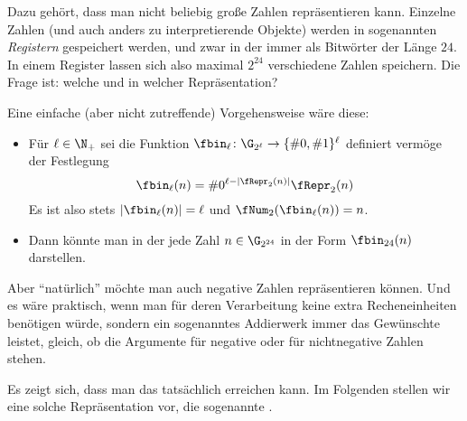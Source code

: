 Dazu gehört, dass man nicht beliebig große Zahlen repräsentieren kann.
%
Einzelne Zahlen (und auch anders zu interpretierende Objekte) werden
in sogenannten \emph{Registern} gespeichert werden, und zwar in der
\mima immer als Bitwörter der Länge $24$. 
%
In einem Register lassen sich also maximal $2^{24}$
verschiedene Zahlen speichern. 
%
Die Frage ist: welche und in welcher Repräsentation?

Eine einfache (aber nicht zutreffende) Vorgehensweise wäre diese: 
%
\begin{itemize}
\item Für $\ell\in\N_+$ sei die Funktion
  $\fbin_{\ell}\colon \G_{2^{\ell}} \to \{\#0,\#1\}^{\ell}$ definiert
  vermöge der Festlegung
  \[
  \fbin_{\ell}(n) = \#0^{\ell- |\fRepr_2(n)|} \fRepr_2(n)
  \]
  Es ist also stets $|\fbin_{\ell}(n)| =\ell$ und $\fNum_2(\fbin_{\ell}(n))=n$.
\item Dann könnte man in der \mima jede Zahl $n\in \G_{2^{24}}$ in der
  Form $\fbin_{24}(n)$ darstellen.
\end{itemize}
% 
Aber "`natürlich"' möchte man auch negative Zahlen repräsentieren
können. 
%
Und es wäre praktisch, wenn man für deren Verarbeitung keine extra
Recheneinheiten benötigen würde, sondern \zB ein sogenanntes
Addierwerk immer das Gewünschte leistet, gleich, ob die Argumente für
negative oder für nichtnegative Zahlen stehen.

Es zeigt sich, dass man das tatsächlich erreichen kann. 
%
Im Folgenden stellen wir eine solche Repräsentation vor, die
sogenannte
.


